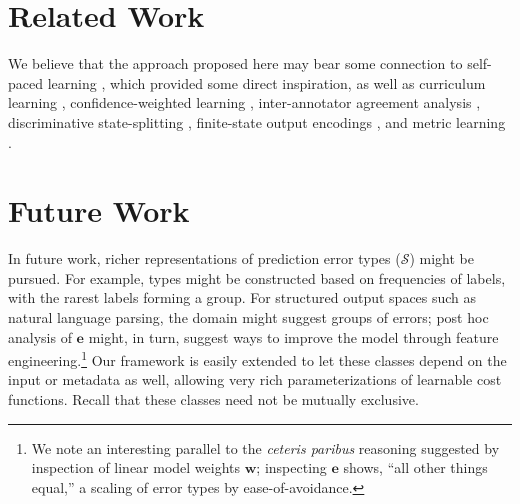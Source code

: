 \documentclass{article} %
\newcommand{\forpubnote}[1]{}
\begin{document}
\forpubnote{Here is a list of related work:
\begin{enumerate}
\item Self-paced learning \citep{kumar2010self}\footnote{The
objective function used in self-paced learning provided 
some inspiration
for our objective function.}
\item Curriculum learning 
\item Confidence weighted learning 
\item Inter-annotator agreement cost 
\item State splitting  
\item Finite state output encodings 
\item Metric learning, \url{http://machinelearning.wustl.edu/mlpapers/paper_files/AA03.pdf}
\end{enumerate}}


\section{Related Work}

We believe that the approach proposed here may bear some connection to 
self-paced learning \citep{kumar2010self}, which provided some direct
inspiration, as well as curriculum learning
\citep{bengio2009curriculum}, confidence-weighted learning
\citep{dredze2008confidence},
inter-annotator agreement analysis \citep{plank2014learning},
discriminative state-splitting \citep{petrov2011coarse}, finite-state
output encodings \citep{loper2008encoding}, and metric learning \citep{xing2002distance}.

\section{Future Work}

In future work, richer representations of prediction error types
($\mathcal{S}$) might be pursued.  For example, types might be 
constructed based on frequencies of labels, with the rarest labels forming
a group.  For structured output spaces such as natural language
parsing, the domain might suggest
groups of errors; post hoc analysis of $\mathbf{e}$ might, in turn,
suggest ways to improve the model through feature
engineering.\footnote{We note an interesting parallel to the
  \emph{ceteris paribus} reasoning suggested by inspection of
linear model weights $\mathbf{w}$; inspecting $\mathbf{e}$ shows,
``all other things equal,'' a scaling of error types by ease-of-avoidance.}
Our framework is easily extended to let these classes depend on
the input or metadata as well, allowing very rich parameterizations of
learnable cost functions.  Recall that these classes need not be mutually exclusive.
\end{document}
